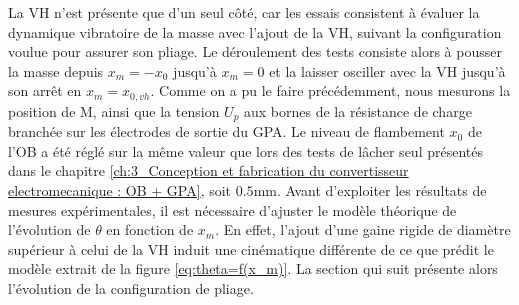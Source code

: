 La VH n'est présente que d'un seul côté, car les essais consistent à évaluer la dynamique vibratoire de la masse avec l'ajout de la VH, suivant la configuration voulue pour assurer son pliage. Le déroulement des tests consiste alors à pousser la masse depuis $x_m=-x_0$ jusqu'à $x_m=0$ et la laisser osciller avec la VH jusqu'à son arrêt en $x_m=x_{0,vh}$. Comme on a pu le faire précédemment, nous mesurons la position de M, ainsi que la tension $U_p$ aux bornes de la résistance de charge branchée sur les électrodes de sortie du GPA. Le niveau de flambement $x_0$ de l'OB a été réglé sur la même valeur que lors des tests de lâcher seul présentés dans le chapitre \ref{ch:3_Conception et fabrication du convertisseur electromecanique : OB + GPA}, soit $0.5$mm. Avant d'exploiter les résultats de mesures expérimentales, il est nécessaire d'ajuster le modèle théorique de l'évolution de $\theta$ en fonction de $x_m$. En effet, l'ajout d'une gaine rigide de diamètre supérieur à celui de la VH induit une cinématique différente de ce que prédit le modèle extrait de la figure \ref{eq:theta=f(x_m)}. La section qui suit présente alors l'évolution de la configuration de pliage.
